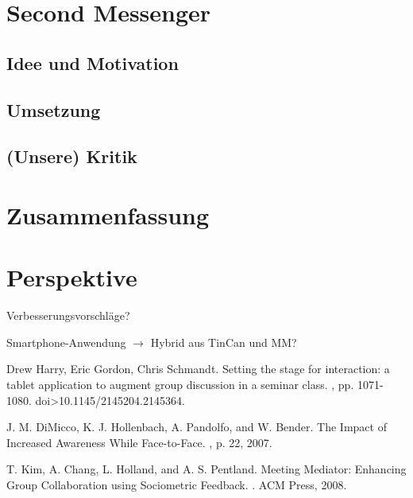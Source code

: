 \documentclass{seminarvorlage}
\begin{document}
\section{Second Messenger}
\subsection{Idee und Motivation}
\subsection{Umsetzung}
\subsection{(Unsere) Kritik}

\section{Zusammenfassung}

\section{Perspektive}
Verbesserungsvorschläge? 

Smartphone-Anwendung $\rightarrow$ Hybrid aus TinCan und MM?

\begin{thebibliography}{9}

Drew Harry, Eric Gordon, Chris Schmandt.
\newblock Setting the stage for interaction: a tablet application to augment group discussion in a seminar class. 
, pp. 1071-1080. doi>10.1145/2145204.2145364. 

J. M. DiMicco, K. J. Hollenbach, A. Pandolfo, and W. Bender.
\newblock The Impact of Increased Awareness While Face-to-Face.
, p. 22, 2007.

T. Kim, A. Chang, L. Holland, and A. S. Pentland.
\newblock Meeting Mediator: Enhancing Group Collaboration using Sociometric Feedback. 
. ACM Press, 2008.

\end{thebibliography}
\end{document}
